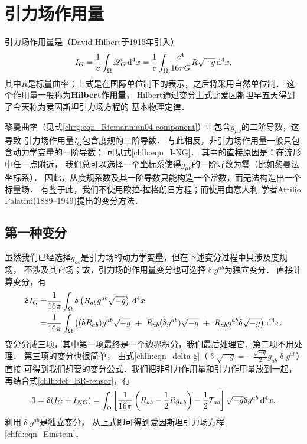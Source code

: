 \section{引力场作用量}\label{chlh:sec_Gravity}

引力场作用量是（David Hilbert于1915年引入）
\begin{equation}\label{chlh:eqn_I-G}
    I_G = \frac{1}{c} \int_\Omega \mathscr{L}_G \,{\rm d}^{4}x =
    \frac{1}{c} \int_\Omega \frac{c^4}{16\pi G} R\sqrt{-g}\,{\rm d}^{4}x .
\end{equation}
其中$R$是标量曲率；上式是在国际单位制下的表示，之后将采用自然单位制．
这个作用量一般称为{\bfseries\heiti Hilbert作用量}，
Hilbert通过变分上式比爱因斯坦早五天得到了今天称为爱因斯坦引力场方程的
基本物理定律\cite[\S 14(d)]{Pais-1982}．

黎曼曲率（见式\eqref{chrg:eqn_Riemannian04-component}）中包含$g_{\mu\nu}$的二阶导数，这导致
引力场作用量$I_G$包含度规的二阶导数．
与此相反，非引力场作用量一般只包含动力学变量的一阶导数；
可见式\eqref{chlh:eqn_I-NG}．
其中的直接原因是：在流形中任一点附近，
我们总可以选择一个坐标系使得$g_{\mu\nu}$的一阶导数为零（比如黎曼法坐标系）．
因此，从度规系数及其一阶导数只能构造一个常数，而无法构造出一个标量场．
有鉴于此，我们不使用欧拉-拉格朗日方程；而使用由意大利
学者Attilio Palatini(1889--1949)提出的变分方法．

\subsection{第一种变分}

虽然我们已经选择$g_{ab}$是引力场的动力学变量，但在下述变分过程中只涉及度规场，
不涉及其它场；故，引力场的作用量变分也可选择$\updelta g^{ab}$为独立变分．
直接计算变分，有
\begin{align}
    \updelta I_G =& \frac{1}{16\pi } \int_\Omega
    \updelta \left( R_{ab} g^{ab} \sqrt{-g} \right) \,{\rm d}^{4}x \label{chlh:eqn_Delta-IG}\\
    =& \frac{1}{16\pi } \int_\Omega
     \left( (\updelta R_{ab}) g^{ab} \sqrt{-g} 
     \ +\  R_{ab} (\updelta g^{ab}) \sqrt{-g}
     \ +\ R_{ab} g^{ab} \updelta \sqrt{-g} \right) \,{\rm d}^{4}x . \notag
\end{align}
变分分成三项，其中第一项最终是一个边界积分，我们最后处理它．第二项不用处理．
第三项的变分也很简单，
由式\eqref{chlh:eqn_delta-g}（$\updelta \sqrt{-g}=-\frac{\sqrt{-g}}{2} g_{ab} \updelta g^{ab}$）直接
可得到我们想要的变分公式．我们把非引力作用量和引力作用量放到一起，
再结合式\eqref{chlh:def_BR-tensor}，有
\begin{equation}
    0=\updelta (I_G + I_{NG})
    = \int_\Omega \left[
    \frac{1}{16\pi }\left( R_{ab} -\frac{1}{2}R g_{ab}\right)
    -\frac{1}{2} T_{ab} \right]
    \sqrt{-g} \updelta g^{ab} \,{\rm d}^{4}x .
\end{equation}
利用$\updelta g^{ab}$是独立变分，
从上式即可得到爱因斯坦引力场方程\eqref{chfd:eqn_Einstein}．

